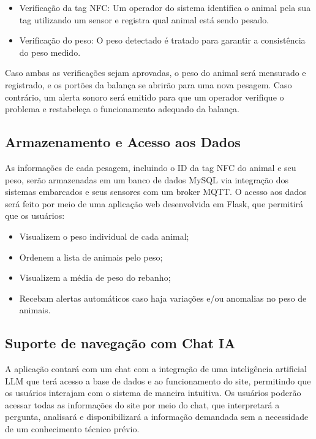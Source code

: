 \documentclass[11pt]{article}
\begin{document}
\begin{itemize}
    \item Verificação da tag NFC: Um operador do sistema identifica o animal pela sua tag utilizando um sensor e registra qual animal está sendo pesado.
    \item Verificação do peso: O peso detectado é tratado para garantir a consistência do peso medido.
\end{itemize}

Caso ambas as verificações sejam aprovadas, o peso do animal será mensurado e registrado, e os portões da balança se abrirão para uma nova pesagem. Caso contrário, um alerta sonoro será emitido para que um operador verifique o problema e restabeleça o funcionamento adequado da balança.

\subsection{Armazenamento e Acesso aos Dados}
As informações de cada pesagem, incluindo o ID da tag NFC do animal e seu peso, serão armazenadas em um banco de dados MySQL via integração dos sistemas embarcados e seus sensores com um broker MQTT. O acesso aos dados será feito por meio de uma aplicação web desenvolvida em Flask, que permitirá que os usuários:

\begin{itemize}
    \item Visualizem o peso individual de cada animal;
    \item Ordenem a lista de animais pelo peso;
    \item Visualizem a média de peso do rebanho;
    \item Recebam alertas automáticos caso haja variações e/ou anomalias no peso de animais.
\end{itemize}

\subsection{Suporte de navegação com Chat IA}
A aplicação contará com um chat com a integração de uma inteligência artificial LLM que terá acesso a base de dados e ao funcionamento do site, permitindo que os usuários interajam com o sistema de maneira intuitiva. Os usuários poderão acessar todas as informações do site por meio do chat, que interpretará a pergunta, analisará e disponibilizará a informação demandada sem a necessidade de um conhecimento técnico prévio.
\end{document}
